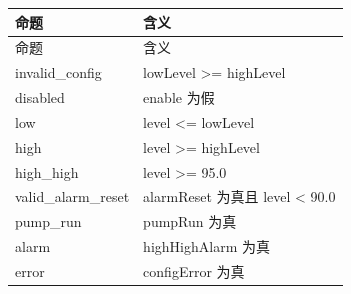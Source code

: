 \begin{longtable}{L{3.3cm}L{10.0cm}}

\toprule

命题 & 含义\\

\midrule

\endfirsthead

\toprule

命题 & 含义\\

\midrule

\endhead

{\ttfamily invalid\_config} & lowLevel >= highLevel\\

{\ttfamily disabled} & enable 为假\\

{\ttfamily low} & level <= lowLevel\\

{\ttfamily high} & level >= highLevel\\

{\ttfamily high\_high} & level >= 95.0\\

{\ttfamily valid\_alarm\_reset} & alarmReset 为真且 level < 90.0\\

{\ttfamily pump\_run} & pumpRun 为真\\

{\ttfamily alarm} & highHighAlarm 为真\\

{\ttfamily error} & configError 为真\\

\bottomrule

\end{longtable}

